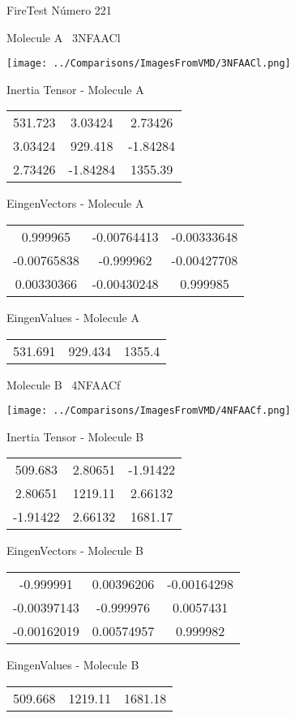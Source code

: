 \vtab[-3cm]
\begin{center}
{\large FireTest \tab Número 221}
\end{center}
\begin{multicols}{2}
\begin{center}

Molecule A \
3NFAACl

\texttt{[image: ../Comparisons/ImagesFromVMD/3NFAACl.png]}

Inertia Tensor - Molecule A \\
\begin{tabular}{|c c c|}
531.723	 & 	3.03424	 & 	2.73426	 \\
3.03424	 & 	929.418	 & 	-1.84284	 \\
2.73426	 & 	-1.84284	 & 	1355.39
\end{tabular}

\vtab
 EingenVectors - Molecule A     \\
\begin{tabular}{|c c c|}
0.999965	 & 	-0.00764413	 & 	-0.00333648	 \\
-0.00765838	 & 	-0.999962	 & 	-0.00427708	 \\
0.00330366	 & 	-0.00430248	 & 	0.999985
\end{tabular}

\vtab
 EingenValues - Molecule A     \\
\begin{tabular}{|c c c|}
531.691	 & 	929.434	 & 	1355.4	 \\
\end{tabular}
\columnbreak

Molecule B \
4NFAACf

\texttt{[image: ../Comparisons/ImagesFromVMD/4NFAACf.png]}

Inertia Tensor - Molecule B \\
\begin{tabular}{|c c c|}
509.683	 & 	2.80651	 & 	-1.91422	 \\
2.80651	 & 	1219.11	 & 	2.66132	 \\
-1.91422	 & 	2.66132	 & 	1681.17
\end{tabular}

\vtab
 EingenVectors - Molecule B     \\
\begin{tabular}{|c c c|}
-0.999991	 & 	0.00396206	 & 	-0.00164298	 \\
-0.00397143	 & 	-0.999976	 & 	0.0057431	 \\
-0.00162019	 & 	0.00574957	 & 	0.999982
\end{tabular}

\vtab
 EingenValues - Molecule B     \\
\begin{tabular}{|c c c|}
509.668	 & 	1219.11	 & 	1681.18	 \\
\end{tabular}

\end{center}
\end{multicols}

